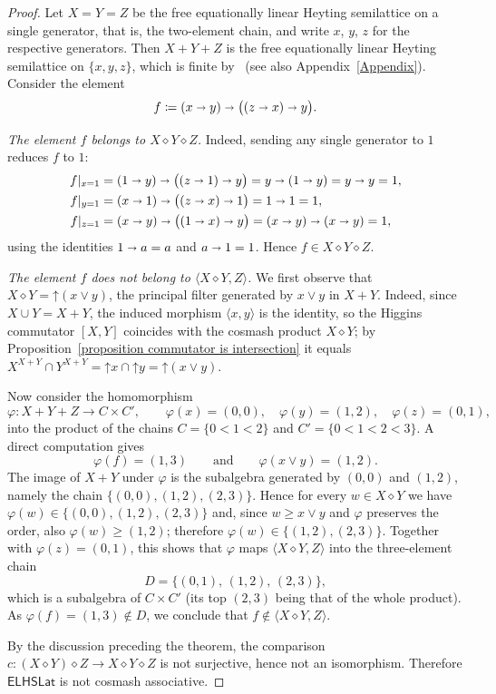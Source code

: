 \documentclass[reqno,a4paper]{amsart}
\theoremstyle{remark}
\theoremstyle{definition}
\newcommand{\omeet}{\cap} %
\newcommand{\ojoin}{\cup}  %
\newcommand{\iimplies}{\shortrightarrow}
\newcommand{\ELHSLat}{\ensuremath{\mathsf{ELHSLat}}}
\renewcommand{\geq}{\geqslant}
\begin{document}
\begin{proof}
	Let \(X=Y=Z\) be the free equationally linear Heyting semilattice on a single generator, that is, the two-element chain, and write \(x\), \(y\), \(z\) for the respective generators. Then \(X+Y+Z\) is the free equationally linear Heyting semilattice on \(\{x,y,z\}\), which is finite by~\cite{NeWh} (see also Appendix~\ref{Appendix}). Consider the element
	\[
		f \coloneq (x\iimplies y) \iimplies \bigl((z\iimplies x)\iimplies y\bigr).
	\]

	\emph{The element \(f\) belongs to \(X\diamond Y\diamond Z\).} Indeed, sending any single generator to \(1\) reduces \(f\) to \(1\):
	\begin{align*}
		f|_{x=1} & = (1\iimplies y)\iimplies\bigl((z\iimplies 1)\iimplies y\bigr) = y\iimplies(1\iimplies y) = y\iimplies y = 1, \\
		f|_{y=1} & = (x\iimplies 1)\iimplies\bigl((z\iimplies x)\iimplies 1\bigr) = 1\iimplies 1 = 1,                            \\
		f|_{z=1} & = (x\iimplies y)\iimplies\bigl((1\iimplies x)\iimplies y\bigr) = (x\iimplies y)\iimplies(x\iimplies y) = 1,
	\end{align*}
	using the identities \(1\iimplies a = a\) and \(a\iimplies 1 = 1\). Hence \(f\in X\diamond Y\diamond Z\).

	\emph{The element \(f\) does not belong to \(\langle X\diamond Y, Z\rangle\).} We first observe that \(X\diamond Y = \mathord{\uparrow}(x\vee y)\), the principal filter generated by \(x\vee y\) in \(X+Y\). Indeed, since \(X\ojoin Y = X+Y\), the induced morphism \(\langle x,y\rangle\) is the identity, so the Higgins commutator \([X,Y]\) coincides with the cosmash product \(X\diamond Y\); by Proposition~\ref{proposition commutator is intersection} it equals \(X^{X+Y}\omeet Y^{X+Y} = \mathord{\uparrow}x \omeet \mathord{\uparrow}y = \mathord{\uparrow}(x\vee y)\).

	Now consider the homomorphism
	\[
		\varphi\colon X+Y+Z \longrightarrow C\times C', \qquad
		\varphi(x) = (0,0),\quad \varphi(y)=(1,2),\quad \varphi(z)=(0,1),
	\]
	into the product of the chains \(C=\{0<1<2\}\) and \(C'=\{0<1<2<3\}\). A direct computation gives
	\[
		\varphi(f) = (1,3) \qquad\text{and}\qquad \varphi(x\vee y) = (1,2).
	\]
	The image of \(X+Y\) under \(\varphi\) is the subalgebra generated by \((0,0)\) and \((1,2)\), namely the chain \(\{(0,0),(1,2),(2,3)\}\). Hence for every \(w\in X\diamond Y\) we have \(\varphi(w)\in\{(0,0),(1,2),(2,3)\}\) and, since \(w\geq x\vee y\) and \(\varphi\) preserves the order, also \(\varphi(w)\geq(1,2)\); therefore \(\varphi(w)\in\{(1,2),(2,3)\}\). Together with \(\varphi(z)=(0,1)\), this shows that \(\varphi\) maps \(\langle X\diamond Y, Z\rangle\) into the three-element chain
	\[
		D = \{(0,1),\,(1,2),\,(2,3)\},
	\]
	which is a subalgebra of \(C\times C'\) (its top \((2,3)\) being that of the whole product). As \(\varphi(f)=(1,3)\notin D\), we conclude that \(f\notin\langle X\diamond Y, Z\rangle\).

	By the discussion preceding the theorem, the comparison \(c\colon (X\diamond Y)\diamond Z\to X\diamond Y\diamond Z\) is not surjective, hence not an isomorphism. Therefore \(\ELHSLat\) is not cosmash associative.
\end{proof}
\end{document}

